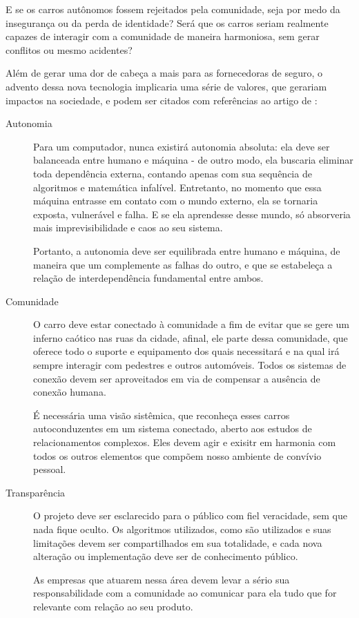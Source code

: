 \documentclass[12pt]{article}
\begin{document}
		E se os carros autônomos fossem rejeitados pela comunidade, seja por medo da insegurança ou da perda de identidade? Será que os carros seriam realmente capazes de interagir com a comunidade de maneira harmoniosa, sem gerar conflitos ou mesmo acidentes?
		
		Além de gerar uma dor de cabeça a mais para as fornecedoras de seguro, o advento dessa nova tecnologia implicaria uma série de valores, que gerariam impactos na sociedade, e podem ser citados com referências ao artigo de \citet{mcbride_ethics_2016}:
		\begin{description}
			\item [Autonomia] Para um computador, nunca existirá autonomia absoluta: ela deve ser balanceada entre humano e máquina - de outro modo, ela buscaria eliminar toda dependência externa, contando apenas com sua sequência de algoritmos e matemática infalível. Entretanto, no momento que essa máquina entrasse em contato com o mundo externo, ela se tornaria exposta, vulnerável e falha. E se ela aprendesse desse mundo, só absorveria mais imprevisibilidade e caos ao seu sistema.
			
			Portanto, a autonomia deve ser equilibrada entre humano e máquina, de maneira que um complemente as falhas do outro, e que se estabeleça a relação de interdependência fundamental entre ambos.
			
			\item [Comunidade] O carro deve estar conectado à comunidade a fim de evitar que se gere um inferno caótico nas ruas da cidade, afinal, ele parte dessa comunidade, que oferece todo o suporte e equipamento dos quais necessitará e na qual irá sempre interagir com pedestres e outros automóveis. Todos os sistemas de conexão devem ser aproveitados em via de compensar a ausência de conexão humana.
			
			É necessária uma visão sistêmica, que reconheça esses carros autoconduzentes em um sistema conectado, aberto aos estudos de relacionamentos complexos. Eles devem agir e exisitr em harmonia com todos os outros elementos que compõem nosso ambiente de convívio pessoal.
			
			\item [Transparência] O projeto deve ser esclarecido para o público com fiel veracidade, sem que nada fique oculto. Os algoritmos utilizados, como são utilizados e suas limitações devem ser compartilhados em sua totalidade, e cada nova alteração ou implementação deve ser de conhecimento público.
			
			As empresas que atuarem nessa área devem levar a sério sua responsabilidade com a comunidade ao comunicar para ela tudo que for relevante com relação ao seu produto.
			

\end{description}
\end{document}
